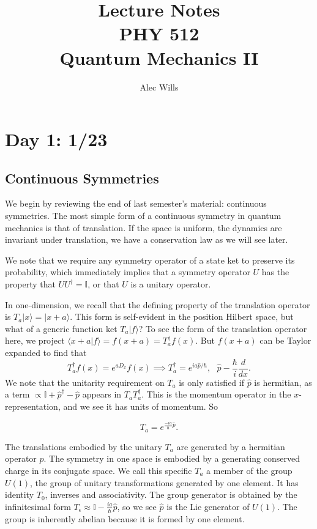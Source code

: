 \documentclass[fontsize=12pt]{scrartcl}
\title{Lecture Notes\\
PHY 512\\
Quantum Mechanics II}
\author{Alec Wills}
\date{}
\newcommand{\bb}[1]{\mathbb{#1}}
\newcommand{\Id}{\bb{I}}
\newcommand{\la}{\langle}
\newcommand{\ra}{\rangle}
\newcommand{\mom}{\hat{p}}
\begin{document}
\maketitle

\tableofcontents{}

\section{Day 1: 1/23}

\subsection{Continuous Symmetries}

We begin by reviewing the end of last semester's material: continuous symmetries. The most simple form of a continuous symmetry in quantum mechanics is that of translation. If the space is uniform, the dynamics are invariant under translation, we have a conservation law as we will see later.

We note that we require any symmetry operator of a state ket to preserve its probability, which immediately implies that a symmetry operator $U$ has the property that $UU^\dagger=\Id$, or that $U$ is a unitary operator.

In one-dimension, we recall that the defining property of the translation operator is $T_a|x\ra = |x+a\ra$. This form is self-evident in the position Hilbert space, but what of a generic function ket $T_a|f\ra$? To see the form of the translation operator here, we project $\la x+a|f\ra=f(x+a)=T_a^\dagger f(x)$. But $f(x+a)$ can be Taylor expanded to find that $$T_a^\dagger f(x)=e^{aD_x}f(x)\implies T_a^\dagger=e^{ia\mom/\hbar},  \ \ \ \mom - \frac{\hbar}{i}\frac{d}{dx}.$$ We note that the unitarity requirement on $T_a$ is only satisfied if $\mom$ is hermitian, as a term $\propto \Id + \mom^\dagger-\mom$ appears in $T_aT_a^\dagger$. This is the momentum operator in the $x$-representation, and we see it has units of momentum. So \begin{mdframed}
$$T_a=e^{\frac{-ia}{\hbar}\mom}.$$
\end{mdframed} The translations embodied by the unitary $T_a$ are generated by a hermitian operator $\mom$. The symmetry in one space is embodied by a generating conserved charge in its conjugate space. We call this specific $T_a$ a member of the group $U(1)$, the group of unitary transformations generated by one element. It has identity $T_0$, inverses and associativity. The group generator is obtained by the infinitesimal form $T_\epsilon\approx\Id-\frac{ia}{\hbar}\mom$, so we see $\mom$ is the Lie generator of $U(1)$. The group is inherently abelian because it is formed by one element.
\end{document}
